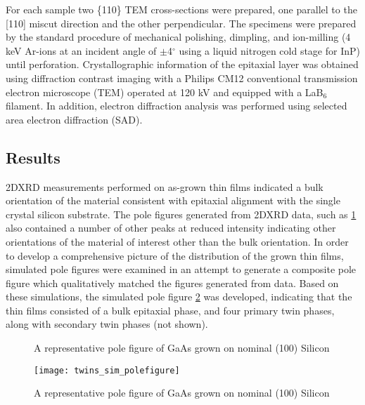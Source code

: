For each sample two \{110\} TEM cross-sections were prepared, one parallel to 
the [110] miscut direction and the other perpendicular. The specimens were 
prepared by the standard procedure of mechanical polishing, dimpling, and 
ion-milling (4 keV Ar-ions at an incident angle of $\pm$4$^\circ$ using a 
liquid nitrogen cold stage for InP) until perforation. Crystallographic 
information of the epitaxial layer was obtained using diffraction contrast 
imaging with a Philips CM12 conventional transmission electron microscope 
(TEM) operated at 120 kV and equipped with a LaB$_6$ filament. In addition, 
electron diffraction analysis was performed using selected area electron 
diffraction (SAD).

\subsection{Results}
2DXRD measurements performed on as-grown thin films indicated a bulk 
orientation of the material consistent with epitaxial alignment with the 
single crystal silicon substrate. The pole figures generated from 2DXRD data, 
such as \cref{fig:twins_pole_example} also contained a number of other peaks 
at reduced intensity indicating other orientations of the material of interest 
other than the bulk orientation. In order to develop a comprehensive picture 
of the distribution of the grown thin films, simulated pole figures were 
examined in an attempt to generate a composite pole figure which qualitatively 
matched the figures generated from data. Based on these simulations, the 
simulated pole figure \cref{fig:twins_sim_polefigure} was developed, 
indicating that the thin films consisted of a bulk epitaxial phase, and four 
primary twin phases, along with secondary twin phases (not shown).

\begin{figure}
    \centering
    \caption{A representative pole figure of GaAs grown on nominal (100) 
    Silicon\label{fig:twins_pole_example}}
\end{figure}
\begin{figure}
    \centering
    \texttt{[image: twins\_sim\_polefigure]}
    \caption{A representative pole figure of GaAs grown on nominal (100) 
        Silicon\label{fig:twins_sim_polefigure}}
\end{figure}